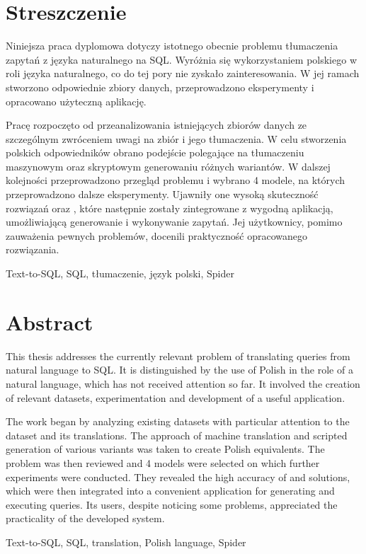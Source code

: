 \section*{Streszczenie}
\vspace{1cm}

Niniejsza praca dyplomowa dotyczy istotnego obecnie problemu tłumaczenia zapytań z języka naturalnego na SQL. Wyróżnia się wykorzystaniem polskiego w roli języka naturalnego, co do tej pory nie zyskało zainteresowania. W jej ramach stworzono odpowiednie zbiory danych, przeprowadzono eksperymenty i opracowano użyteczną aplikację.

Pracę rozpoczęto od przeanalizowania istniejących zbiorów danych ze szczególnym zwróceniem uwagi na zbiór  i jego tłumaczenia. W celu stworzenia polskich odpowiedników obrano podejście polegające na tłumaczeniu maszynowym oraz skryptowym generowaniu różnych wariantów. W dalszej kolejności przeprowadzono przegląd problemu  i wybrano 4 modele, na których przeprowadzono dalsze eksperymenty. Ujawniły one wysoką skuteczność rozwiązań  oraz , które następnie zostały zintegrowane z wygodną aplikacją, umożliwiającą generowanie i wykonywanie zapytań. Jej użytkownicy, pomimo zauważenia pewnych problemów, docenili praktyczność opracowanego rozwiązania.

\vspace{1cm}
Text-to-SQL, SQL, tłumaczenie, język polski, Spider
\clearpage

\section*{Abstract}
\vspace{1cm}

This thesis addresses the currently relevant problem of translating queries from natural language to SQL. It is distinguished by the use of Polish in the role of a natural language, which has not received attention so far. It involved the creation of relevant datasets, experimentation and development of a useful application.

The work began by analyzing existing datasets with particular attention to the  dataset and its translations. The approach of machine translation and scripted generation of various variants was taken to create Polish equivalents. The  problem was then reviewed and 4 models were selected on which further experiments were conducted. They revealed the high accuracy of  and  solutions, which were then integrated into a convenient application for generating and executing queries. Its users, despite noticing some problems, appreciated the practicality of the developed system.

\vspace{1cm}
Text-to-SQL, SQL, translation, Polish language, Spider
\clearpage

